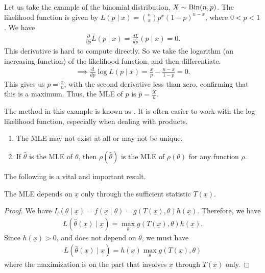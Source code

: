 \begin{example}
    Let us take the example of the binomial distribution, $X \sim \operatorname{Bin} (n,p)$. The likelihood function is given by $L(p \mid x) = \binom{n}{x} p^{x} (1-p)^{n-x}$, where $0 < p < 1$. We have
    \begin{align}
        \frac{\partial}{\partial p} L(p \mid x) = \frac{dL}{dp}(p \mid x) = 0.
    \end{align}
    This derivative is hard to compute directly. So we take the logarithm (an increasing function) of the likelihood function, and then differentiate.
    \begin{align}
        \implies \frac{d}{dp} \log L(p \mid x) = \frac{x}{p} - \frac{n-x}{1-p} = 0.
    \end{align}
    This gives us $p = \frac{x}{n}$, with the second derivative less than zero, confirming that this is a maximum. Thus, the MLE of $p$ is $\hat{p} = \frac{X}{n}$.
\end{example}

The method in this example is known as . It is often easier to work with the log likelihood function, especially when dealing with products.

\begin{remark}
    \begin{enumerate}
        \item The MLE may not exist at all or may not be unique.
        \item If $\hat{\theta}$ is the MLE of $\theta$, then $\rho(\hat{\theta})$ is the MLE of $\rho(\theta)$ for any function $\rho$.
    \end{enumerate}
\end{remark}

The following is a vital and important result.
\begin{theorem}
    The MLE depends on $\underline{x}$ only through the sufficient statistic $T(\underline{x})$.
\end{theorem}
\begin{proof}
    We have $L(\theta \mid \underline{x}) = f(\underline{x} \mid \theta) = g(T(\underline{x}),\theta) h(\underline{x})$. Therefore, we have
    \begin{align}
        L(\hat{\theta}(\underline{x}) \mid \underline{x}) = \max_{\theta} g(T(\underline{x}),\theta) h(\underline{x}).
    \end{align}
    Since $h(\underline{x}) > 0$, and does not depend on $\theta$, we must have
    \begin{align}
        L(\hat{\theta}(\underline{x}) \mid \underline{x}) = h(\underline{x}) \max_{\theta} g(T(\underline{x}),\theta)
    \end{align}
    where the maximization is on the part that involves $\underline{x}$ through $T(\underline{x})$ only.
\end{proof}

